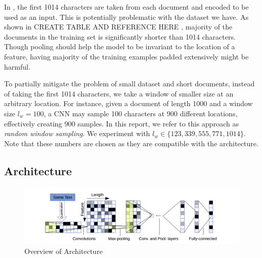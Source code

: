 In \citep{zhang2015character}, the first 1014 characters are taken from each document and encoded to be used as an input.
This is potentially problematic with the dataset we have.
As shown in \color{red} CREATE TABLE AND REFERENCE HERE \color{black}, majority of the documents in the training set is significantly shorter than 1014 characters.
Though pooling should help the model to be invariant to the location of a feature, having majority of the training examples padded extensively might be harmful.

To partially mitigate the problem of small dataset and short documents, instead of taking the first 1014 characters, we take a window of smaller size at an arbitrary location.
For instance, given a document of length 1000 and a window size $l_w = 100$, a CNN may sample 100 characters at 900 different locations, effectively creating 900 samples.
In this report, we refer to this approach as \emph{random window sampling}.
We experiment with $l_w \in \{123, 339, 555, 771, 1014\}$.
Note that these numbers are chosen as they are compatible with the architecture.
\subsection{Architecture}
\begin{figure}[h]
\includegraphics[width=\textwidth]{architecture.png}
\caption{Overview of Architecture}
\label{fig:architecture}
\end{figure}

